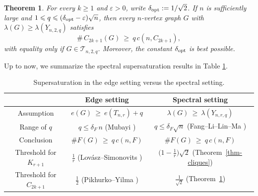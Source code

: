 \documentclass[11pt,a4paper]{article}
\newtheorem{theorem}{Theorem}[section]
\theoremstyle{definition}
\theoremstyle{plain}
\newcommand{\eps}{\varepsilon}
\renewcommand{\le}{\leqslant}
\renewcommand{\ge}{\geqslant}
\begin{document}
\begin{theorem}\label{thm-odd-cycles}
For every $k\ge 1$ and $\eps>0$, write $\delta_{\rm opt} := 1/\sqrt{2}$. If $n$ is sufficiently large and $1\le q\le (\delta_{\rm opt}-\eps)\sqrt n$, then every $n$-vertex graph  $G$ with $\lambda(G)\ge \lambda(Y_{n,2,q})$ satisfies 
$$ \texttt{\#}\, {C_{2k+1}}(G)\ \ge \ q\,c(n,C_{2k+1}),$$
 with equality only if $G\in \mathcal{T}_{n,2,q}$. Moreover, the constant $\delta_{\rm opt}$ is best possible. 
\end{theorem}


Up to now, we summarize the spectral supersaturation results in Table \ref{tab:edge-vs-spec}. 

\begin{table}[htbp]
\centering 
\renewcommand{\arraystretch}{1.3}
\begin{tabular}{@{}ccc@{}}
\toprule
  & Edge setting
  & Spectral setting \\
\midrule
Assumption 
  & $e(G)\ \ge \  e(T_{n,r})+q$
  & $\lambda(G) \  \ge \  \lambda(Y_{n,r,q})$ \\
Range of $q$
  & $q\le \delta_F\, n$
    (Mubayi \cite{Mubayi2010})
  & $q\le \delta_F \sqrt{n}$
    (Fang--Li--Lin--Ma \cite{FLLM2025}) \\
Conclusion
  & $\texttt{\#}F(G) \ \ge \  q\,c(n,F)$
  & $\texttt{\#}F(G) \ \ge  \ q\,c(n,F)$ \\
\hline
Threshold for $K_{r+1}$
  & $\tfrac{1}{r}$
    (Lov\'asz--Simonovits \cite{LS1975})
  & $\bigl(1-\tfrac{1}{r}\bigr)\sqrt{2}$
    (Theorem~\ref{thm-cliques}) \\[2pt]
    \hline 
Threshold for $C_{2k+1}$
  & $\tfrac{1}{2}$
    (Pikhurko--Yilma \cite{PY2017})
  & $\tfrac{1}{\sqrt{2}}$
    (Theorem~\ref{thm-odd-cycles}) \\
\bottomrule
\end{tabular}
\caption{Supersaturation in the edge setting versus the spectral setting.}
\label{tab:edge-vs-spec}
\end{table}
\end{document}
